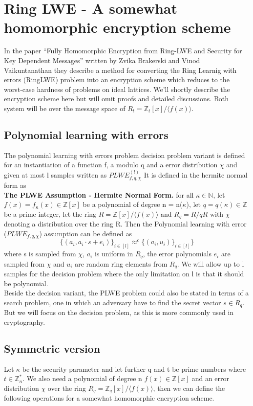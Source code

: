 \documentclass[../main.tex]{subfiles}
\begin{document}
\section{Ring LWE - A somewhat homomorphic encryption scheme} \label{section: RLWE theory}
In the paper ``Fully Homomorphic Encryption from Ring-LWE and Security for Key Dependent Messages'' written by
Zvika Brakerski and Vinod Vaikuntanathan \cite{brakerski2011fully}
they describe a method for converting the Ring Learnig with errors (RingLWE) problem into an encryption scheme
which reduces to the worst-case hardness of problems on ideal lattices.
We'll shortly describe the encryption scheme here but will omit proofs and detailed discussions.
Both system will be over the message space of $R_t = \mathbb{Z}_t[x] / \langle f(x) \rangle $.

\subsection{Polynomial learning with errors}
The polynomial learning with errors problem decision problem variant is defined for an instantiation
of a function f, a modulo q and a error distribution $\chi$ and given at most l samples written as $PLWE_{f, q, \chi}^(l)$
It is defined in the hermite normal form as
\\[2mm]
\textbf{The PLWE Assumption - Hermite Normal Form.}
for all $\kappa \in \mathbb{N}$, let $f(x) = f_{\kappa}(x) \in \mathbb{Z}[x]$
be a polynomial of degree n = n($\kappa$), let $q = q(\kappa) \in \mathbb{Z}$
be a prime integer, let the ring $R = \mathbb{Z}[x] / \langle f(x) \rangle$
and $R_q = R / qR$ with $\chi$ denoting a distribution over the ring R.
Then the Polynomial learning with error ($PLWE_{f,q,\chi}$) assumption can be defined as
$$
    \{ (a_i, a_i \cdot s + e_i) \}_{i \in [l]} \approx^{c} \{(a_i, u_i) \}_{i \in [l]}\}
$$
where s is sampled from $\chi$, $a_i$ is uniform in $R_q$, the error polynomials
$e_i$ are sampled from $\chi$ and $u_i$ are random ring elements from $R_q$.
We will allow up to l samples for the decision problem where the only limitation on l is that it should
be polynomial.
\\[5mm]
Beside the decision variant, the PLWE problem could also be stated in terms of a search problem, one in which
an adversary have to find the secret vector $s \in R_q$. But we will focus on the decision problem, as this
is more commonly used in cryptography.

\subsection{Symmetric version}
Let $\kappa$ be the security parameter and let further q and t be prime numbers where $t \in \mathbb{Z}_n^*$.
We also need a polynomial of degree n $f(x) \in \mathbb{Z}[x]$ and an error distribution $\chi$ over the ring
$R_q = \mathbb{Z}_q[x] / \langle f(x) \rangle$, then we can define the following operations for a somewhat homomorphic
encryption scheme.
\end{document}

